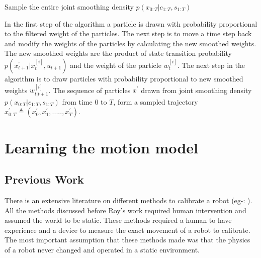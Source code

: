 \documentclass[12pt]{dalcsthesis}
\begin{document}
\begin{algorithm}[H]
 \SetAlgoLined
  	\label{alg:Particle Smoothing}
	\caption{Sample the entire joint smoothing density $p(x_{0:T}|c_{1:T},s_{1:T})$}
	
\end{algorithm}

In the first step of the algorithm a particle is drawn with probability proportional to the filtered weight of the particles. The next step is to move a time step back and modify the weights of the particles by calculating the new smoothed weights. The new smoothed weights are the product of state transition probability $p(x ^{'} _{t+1}|x_{t}^{[i]},u _{t+1})$ and the weight of the particle $w_{t}^{[i]}$. The next step in the algorithm is to draw particles with probability proportional to new smoothed weights $w_{t|t+1}^{[i]}$.  The sequence of particles $x^{'}$ drawn from joint smoothing density $p(x_{0:T}|c_{1:T},s_{1:T})$ from time $0$ to $T$, form a sampled trajectory $x^{'}_{0:T} \triangleq (x^{'}_0,x^{'}_1,.....,x^{'}_T)$.
 
\chapter{Learning the motion model}
\label{learning the motion model}
\section{Previous Work}
There is an extensive literature on different methods to calibrate a robot (eg-: \cite{cox1990autonomous} \cite{vukobratovic1989introduction}). All the methods discussed before Roy's work \cite{Roy} required human intervention and assumed the world to be static. These methods required a human to have experience and a device to measure the exact movement of a robot to calibrate. The most important assumption that these methods made was that the physics of a robot never changed and operated in a static environment. 
\end{document}
